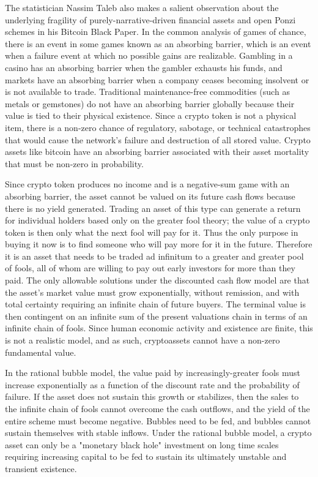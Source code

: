 The statistician Nassim Taleb also makes a salient observation about the
underlying fragility of purely-narrative-driven financial assets and open Ponzi
schemes in his Bitcoin Black Paper. In the common analysis of games of chance,
there is an event in some games known as an absorbing barrier, which is an event
when a failure event at which no possible gains are realizable. Gambling in a
casino has an absorbing barrier when the gambler exhausts his funds, and markets
have an absorbing barrier when a company ceases becoming insolvent or is not
available to trade. Traditional maintenance-free commodities (such as metals or
gemstones) do not have an absorbing barrier globally because their value is tied
to their physical existence. Since a crypto token is not a physical item, there
is a non-zero chance of regulatory, sabotage, or technical catastrophes that
would cause the network's failure and destruction of all stored value. Crypto
assets like bitcoin have an absorbing barrier associated with their asset
mortality that must be non-zero in probability. \cite{taleb_bitcoin_2021}

Since crypto token produces no income and is a negative-sum game with an
absorbing barrier, the asset cannot be valued on its future cash flows because
there is no yield generated. Trading an asset of this type can generate a return
for individual holders based only on the greater fool theory; the value of a
crypto token is then only what the next fool will pay for it. Thus the only
purpose in buying it now is to find someone who will pay more for it in the
future. Therefore it is an asset that needs to be traded ad infinitum to a
greater and greater pool of fools, all of whom are willing to pay out early
investors for more than they paid. The only allowable solutions under the
discounted cash flow model are that the asset's market value must grow
exponentially, without remission, and with total certainty requiring an infinite
chain of future buyers. The terminal value is then contingent on an infinite sum
of the present valuations chain in terms of an infinite chain of fools. Since
human economic activity and existence are finite, this is not a realistic model,
and as such, cryptoassets cannot have a non-zero fundamental value.

In the rational bubble model, the value paid by increasingly-greater fools must
increase exponentially as a function of the discount rate and the probability of
failure. If the asset does not sustain this growth or stabilizes, then the sales
to the infinite chain of fools cannot overcome the cash outflows, and the yield
of the entire scheme must become negative. Bubbles need to be fed, and bubbles
cannot sustain themselves with stable inflows. Under the rational bubble model,
a crypto asset can only be a "monetary black hole" investment on long time
scales requiring increasing capital to be fed to sustain its ultimately unstable
and transient existence.

